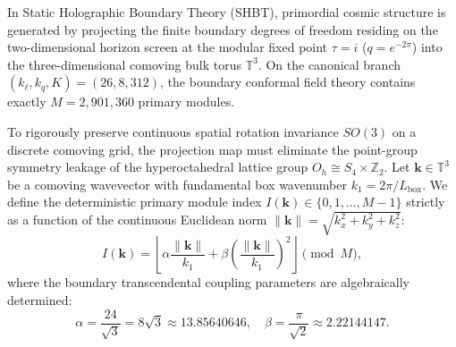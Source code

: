 \documentclass[11pt,letterpaper]{article}
\theoremstyle{plain}
\begin{document}
In Static Holographic Boundary Theory (SHBT), primordial cosmic structure is generated by projecting the finite boundary degrees of freedom residing on the two-dimensional horizon screen at the modular fixed point $\tau = i$ ($q = e^{-2\pi}$) into the three-dimensional comoving bulk torus $\mathbb{T}^3$. On the canonical branch $(k_\ell, k_q, K) = (26, 8, 312)$, the boundary conformal field theory contains exactly $M = 2,901,360$ primary modules.

To rigorously preserve continuous spatial rotation invariance $SO(3)$ on a discrete comoving grid, the projection map must eliminate the point-group symmetry leakage of the hyperoctahedral lattice group $O_h \cong S_4 \times \mathbb{Z}_2$. Let $\mathbf{k} \in \mathbb{T}^3$ be a comoving wavevector with fundamental box wavenumber $k_1 = 2\pi / L_{\text{box}}$. We define the deterministic primary module index $I(\mathbf{k}) \in \{0, 1, \dots, M-1\}$ strictly as a function of the continuous Euclidean norm $\|\mathbf{k}\| = \sqrt{k_x^2 + k_y^2 + k_z^2}$:
\begin{equation}
    I(\mathbf{k}) = \left\lfloor \alpha \frac{\|\mathbf{k}\|}{k_1} + \beta \left(\frac{\|\mathbf{k}\|}{k_1}\right)^2 \right\rfloor \pmod M,
\end{equation}
where the boundary transcendental coupling parameters are algebraically determined:
\begin{equation}
    \alpha = \frac{24}{\sqrt{3}} = 8\sqrt{3} \approx 13.85640646, \quad \beta = \frac{\pi}{\sqrt{2}} \approx 2.22144147.
\end{equation}
\end{document}
